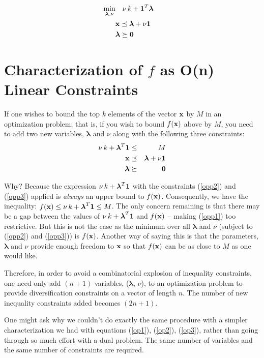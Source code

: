 \documentclass[12pt]{article}
\begin{document}
\begin{eqnarray}
	\mathop{\rm min}_{{\boldsymbol \lambda}, \nu} & \quad \nu \, k + {\bf 1}^T {\boldsymbol \lambda} & \\ 
												  &  {\bf x} \preceq {\boldsymbol \lambda} + \nu {\bf 1} & \\
												  & {\boldsymbol \lambda} \succeq {\bf 0} & 
 \end{eqnarray}

\section{Characterization of $f$ as O(n) Linear Constraints}
If one wishes to bound the top $k$ elements of the vector ${\bf x}$ by $M$ in 
an optimization problem; that is, if you wish to bound $f({\bf x})$ above by $M$, you 
need to add two new variables, ${\boldsymbol \lambda}$ and $\nu$ along with 
the following three constraints:
\begin{eqnarray}
	\nu \, k + {\boldsymbol \lambda}^T {\bf 1}  & \le & M \label{opp1} \\ 
	{\bf x} & \preceq & {\boldsymbol \lambda} + \nu {\bf 1} \label{opp2} \\
	{\boldsymbol \lambda} & \succeq & {\bf 0}  \label{opp3}
\end{eqnarray}

Why? Because the expression $\nu \, k + {\boldsymbol \lambda}^T {\bf 1}$ with
the constraints (\ref{opp2}) and (\ref{opp3}) applied is {\it always\/} 
an upper bound to $f({\bf x})$. 
Consequently, we have the inequality: 
$f({\bf x}) \le \nu \, k + {\boldsymbol \lambda}^T {\bf 1} \le M$.
The only concern remaining is that there may be a gap between the values of 
$\nu \, k + {\boldsymbol \lambda}^T {\bf 1}$ 
and $f({\bf x})$ -- making (\ref{opp1}) too restrictive. 
But this is not the case as the minimum over all ${\boldsymbol \lambda}$ 
and $\nu$ (subject to (\ref{opp2}) and (\ref{opp3})) is $f({\bf x})$.
Another way of saying this is that the parameters, ${\boldsymbol \lambda}$ and $\nu$
provide enough freedom to ${\bf x}$ so that $f({\bf x})$ can be as close to $M$ as one would like.

Therefore, in order to avoid a combinatorial explosion of inequality constraints, 
one need only add $(n+1)$ variables, (${\boldsymbol \lambda}, \, \nu$), to an 
optimization problem to provide diversification constraints on a vector of length $n$.
The number of new inequality constraints added becomes $(2n+1)$.

One might ask why we couldn't do exactly the same procedure with a simpler characterization we had 
with equations
(\ref{op1}), (\ref{op2}), (\ref{op3}), rather than going through so much effort with a dual problem.
The same number of variables and the same number of constraints are required.
\end{document}
